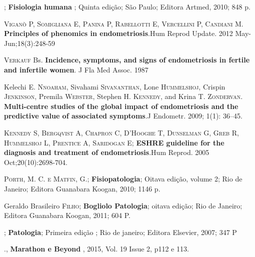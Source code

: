 \documentclass[12pt]{article} %
\begin{document}
;\textbf{ Fisiologia humana} ; Quinta edição; São Paulo; Editora Artmed, 2010; 848 p.

\vspace{0,5cm}

\textsc{Viganò P, Somigliana E, Panina P, Rabellotti E, Vercellini P, Candiani M}. \textbf{Principles of phenomics in endometriosis}.Hum Reprod Update. 2012 May-Jun;18(3):248-59

\vspace{0,5cm}

\textsc{Verkauf} Bs. \textbf{ Incidence, symptoms, and signs of endometriosis in fertile and infertile women}. J Fla Med Assoc. 1987

\vspace{0,5cm}

Kelechi E.\textsc{ Nnoaham}, Sivahami \textsc{Sivananthan}, Lone \textsc{Hummelshoj}, Crispin \textsc{Jenkinson}, Premila\textsc{ Webster}, Stephen H. \textsc{Kennedy}, and Krina T. \textsc{Zondervan}.\textbf{ Multi-centre studies of the global impact of endometriosis and the predictive value of associated symptoms}.J Endometr. 2009; 1(1): 36–45. 

\vspace{0,5cm}

\textsc{Kennedy S, Bergqvist A, Chapron C, D'Hooghe T, Dunselman G, Greb R, Hummelshoj L, Prentice A, Saridogan E}; \textbf{ESHRE guideline for the diagnosis and treatment of endometriosis}.Hum Reprod. 2005 Oct;20(10):2698-704. 

\vspace{0,5cm}

\textsc{Porth, M. C. e Matfin, G}.;\textbf{ Fisiopatologia}; Oitava edição, volume 2; Rio de
Janeiro; Editora Guanabara Koogan, 2010; 1146 p.

\vspace{0,5cm}

Geraldo Brasileiro\textsc{ Filho}; \textbf{Bogliolo Patologia}; oitava edição; Rio de Janeiro; Editora Guanabara Koogan, 2011; 604 P.

\vspace{0,5cm}

;\textbf{ Patologia}; Primeira edição ; Rio de
janeiro; Editora Elsevier, 2007; 347 P

\vspace{0,5cm}

., \textbf{Marathon e Beyond }, 2015, Vol. 19 Issue 2, p112 e 113.
\end{document}
